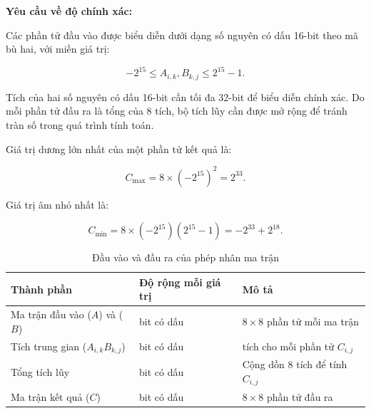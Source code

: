 \noindent
\textbf{Yêu cầu về độ chính xác:}

Các phần tử đầu vào được biểu diễn dưới dạng số nguyên
có dấu 16-bit theo mã bù hai, với miền giá trị:

\begin{equation}
-2^{15} \leq A_{i,k},B_{k,j} \leq 2^{15}-1.
\tag{2.2}
\end{equation}

Tích của hai số nguyên có dấu 16-bit cần tối đa 32-bit
để biểu diễn chính xác. Do mỗi phần tử đầu ra là tổng
của 8 tích, bộ tích lũy cần được mở rộng để tránh
tràn số trong quá trình tính toán.

Giá trị dương lớn nhất của một phần tử kết quả là:

\begin{equation}
C_{\max}=8\times(-2^{15})^2=2^{33}.
\tag{2.3}
\end{equation}

Giá trị âm nhỏ nhất là:

\begin{equation}
C_{\min}
=8\times(-2^{15})(2^{15}-1)
=-2^{33}+2^{18}.
\tag{2.4}
\end{equation}

\begin{table}[H]
    \centering
    \caption{Đầu vào và đầu ra của phép nhân ma trận}
    \label{tab:matrix_bitwidth}

    \begin{tabularx}{\textwidth}{
        >{\raggedright\arraybackslash}X
        >{\raggedright\arraybackslash}p{3cm}
        >{\raggedright\arraybackslash}X
    }
        \toprule
        \textbf{Thành phần} &
        \textbf{Độ rộng mỗi giá trị} &
        \textbf{Mô tả} \\
        \midrule

        Ma trận đầu vào ($A$) và ($B$) &
        16 bit có dấu &
        $8 \times 8$ phần tử mỗi ma trận \\

        Tích trung gian ($A_{i,k}B_{k,j}$) &
        32 bit có dấu &
        8 tích cho mỗi phần tử $C_{i,j}$ \\

        Tổng tích lũy &
        35 bit có dấu &
        Cộng dồn 8 tích để tính $C_{i,j}$ \\

        Ma trận kết quả ($C$) &
        35 bit có dấu &
        $8 \times 8$ phần tử đầu ra \\

        \bottomrule
    \end{tabularx}
\end{table}

